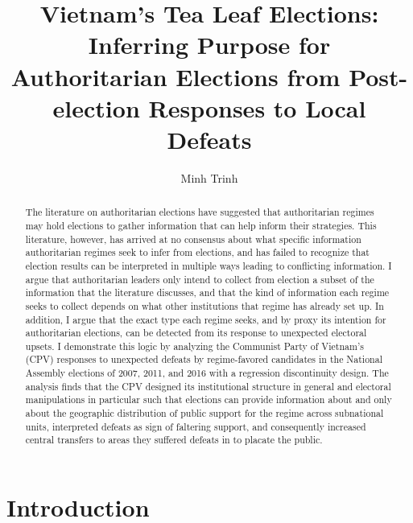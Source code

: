 \documentclass[12pt]{article}\usepackage[]{graphicx}\usepackage[]{color}
\title{Vietnam's Tea Leaf Elections: \\
	Inferring Purpose for Authoritarian Elections from Post-election Responses to Local Defeats}
\author{Minh Trinh}
\newcommand{\1}{\mathbbm{1}}
\begin{document}
\maketitle

\begin{abstract}
	The literature on authoritarian elections have suggested that authoritarian regimes may hold elections to gather information that can help inform their strategies. This literature, however, has arrived at no consensus about what specific information authoritarian regimes seek to infer from elections, and has failed to recognize that election results can be interpreted in multiple ways leading to conflicting information. I argue that authoritarian leaders only intend to collect from election a subset of the information that the literature discusses, and that the kind of information each regime seeks to collect depends on what other institutions that regime has already set up. In addition, I argue that the exact type each regime seeks, and by proxy its intention for authoritarian elections, can be detected from its response to unexpected electoral upsets. I demonstrate this logic by analyzing the Communist Party of Vietnam's (CPV) responses to unexpected defeats by regime-favored candidates in the National Assembly elections of 2007, 2011, and 2016 with a regression discontinuity design. The analysis finds that the CPV designed its institutional structure in general and electoral manipulations in particular such that elections can provide information about and only about the geographic distribution of public support for the regime across subnational units, interpreted defeats as sign of faltering support, and consequently increased central transfers to areas they suffered defeats in to placate the public.
\end{abstract}

\doublespacing

\section{Introduction}
\end{document}
